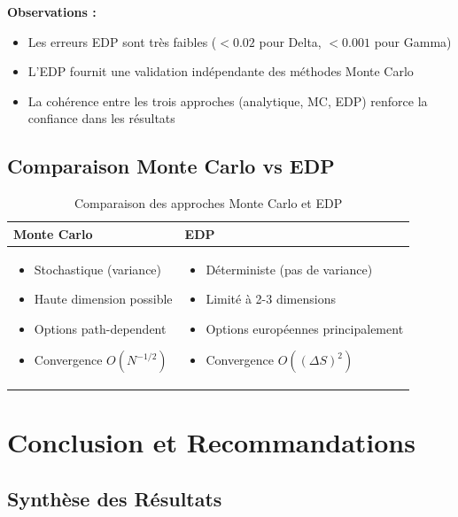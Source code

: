 \documentclass[a4paper,11pt]{article}
\theoremstyle{definition}
\begin{document}
\textbf{Observations :}
\begin{itemize}
    \item Les erreurs EDP sont très faibles ($< 0.02$ pour Delta, $< 0.001$ pour Gamma)
    \item L'EDP fournit une validation indépendante des méthodes Monte Carlo
    \item La cohérence entre les trois approches (analytique, MC, EDP) renforce la confiance dans les résultats
\end{itemize}

\subsection{Comparaison Monte Carlo vs EDP}

\begin{table}[H]
\centering
\begin{tabular}{p{5cm}p{5cm}}
\toprule
\textbf{Monte Carlo} & \textbf{EDP} \\
\midrule
\begin{itemize}[leftmargin=*]
    \item Stochastique (variance)
    \item Haute dimension possible
    \item Options path-dependent
    \item Convergence $O(N^{-1/2})$
\end{itemize}
&
\begin{itemize}[leftmargin=*]
    \item Déterministe (pas de variance)
    \item Limité à 2-3 dimensions
    \item Options européennes principalement
    \item Convergence $O((\Delta S)^2)$
\end{itemize}
\\
\bottomrule
\end{tabular}
\caption{Comparaison des approches Monte Carlo et EDP}
\end{table}

\section{Conclusion et Recommandations}

\subsection{Synthèse des Résultats}
\end{document}
